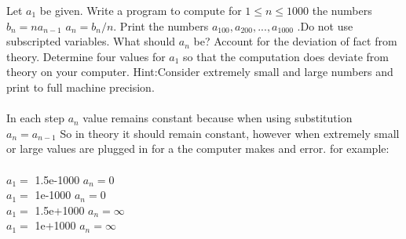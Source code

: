 \documentclass[12pt]{article}
\newenvironment{problem}[2][Problem]{\begin{trivlist}
\item[\hskip \labelsep {\bfseries #1}\hskip \labelsep {\bfseries #2.}]}{\end{trivlist}}
\begin{document}
\begin{problem}{9}
 Let $a_1$ be given. Write a program to compute for $1\leq n\leq 1000$ the numbers $b_n =n a_{n-1}$ $ a_n  = b_n/n.$ Print the numbers $a_{100},a_{200},...,a_{1000}$ .Do not use subscripted variables. What should $a_n$ be? Account for the deviation of fact from theory. Determine four values for $a_1$ so that the computation does deviate from theory on your computer. Hint:Consider extremely small and large numbers and print to full machine precision. \\
 \text{ }\\
 In each step $a_n$ value remains constant because when using substitution $a_n = a_{n-1}$ So in theory it should remain constant, however when extremely small or large values are plugged in for a the computer makes and error. for example:\\
  \text{ }\\
 $a_1 =$ 1.5e-1000 $a_n = 0$\\
  $a_1 =$ 1e-1000 $a_n = 0$\\
   $a_1 =$ 1.5e+1000 $a_n = \infty$\\
  $a_1 =$ 1e+1000 $a_n = \infty$\\
 

\end{problem}
\end{document}

